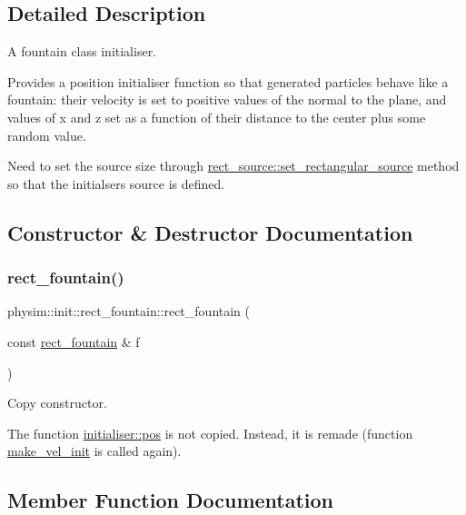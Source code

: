 \subsection{Detailed Description}
A fountain class initialiser. 

Provides a position initialiser function so that generated particles behave like a fountain\+: their velocity is set to positive values of the normal to the plane, and values of x and z set as a function of their distance to the center plus some random value.

Need to set the source size through \hyperlink{classphysim_1_1init_1_1rect__source_a6f398085d0f0391b2acf91cebd5b97c1}{rect\+\_\+source\+::set\+\_\+rectangular\+\_\+source} method so that the initialser\textquotesingle{}s source is defined. 

\subsection{Constructor \& Destructor Documentation}
\mbox{\label{classphysim_1_1init_1_1rect__fountain_a514a1cf5c7feb99f1e2bddbfac585099}} 
\subsubsection{\texorpdfstring{rect\+\_\+fountain()}{rect\_fountain()}}
{\footnotesize\ttfamily physim\+::init\+::rect\+\_\+fountain\+::rect\+\_\+fountain (\begin{DoxyParamCaption}\item[{const \hyperlink{classphysim_1_1init_1_1rect__fountain}{rect\+\_\+fountain} \&}]{f }\end{DoxyParamCaption})}



Copy constructor. 

The function \hyperlink{classphysim_1_1init_1_1initialiser_a1980105ffaa655858b90a8f3a9368682}{initialiser\+::pos} is not copied. Instead, it is remade (function \hyperlink{classphysim_1_1init_1_1rect__fountain_a3070a3ff21834d8a9a8315dac3e6fffe}{make\+\_\+vel\+\_\+init} is called again). 

\subsection{Member Function Documentation}
\mbox{\label{classphysim_1_1init_1_1rect__fountain_a3070a3ff21834d8a9a8315dac3e6fffe}} 
